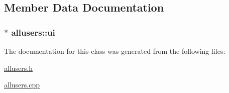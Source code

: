 \subsection{Member Data Documentation}
\hypertarget{classallusers_a3a8127e4f183a49f532a696a341efdbf}{
\subsubsection[{ui}]{$\ast$ allusers\-::ui\hspace{0.3cm}{\ttfamily [private]}}}\label{classallusers_a3a8127e4f183a49f532a696a341efdbf}


The documentation for this class was generated from the following files\-:\begin{DoxyCompactItemize}
\item 
\hyperlink{allusers_8h}{allusers.\-h}\item 
\hyperlink{allusers_8cpp}{allusers.\-cpp}\end{DoxyCompactItemize}
